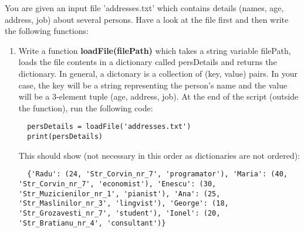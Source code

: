 \documentclass[11pt,a4paper]{report}
\begin{document}
You are given an input file 'addresses.txt' which contains details (names, age, address, job) about several persons. Have a look at the file first and then write the following functions:
\begin{enumerate}
 \item Write a function \textbf{loadFile(filePath)} which takes a string variable filePath, loads the file contents in a dictionary called persDetails and returns the dictionary. In general, a dictonary is a collection of (key, value) pairs. In your case, the key will be a string representing the person's name and the value will be a 3-element tuple (age, address, job). At the end of the script (outside the function), run the following code:
  \begin{lstlisting}
  persDetails = loadFile('addresses.txt')
  print(persDetails)
  \end{lstlisting}  
  This should show (not necessary in this order as dictionaries are not ordered):
  \begin{lstlisting}
  {'Radu': (24, 'Str_Corvin_nr_7', 'programator'), 'Maria': (40, 'Str_Corvin_nr_7', 'economist'), 'Enescu': (30, 'Str_Muzicienilor_nr_1', 'pianist'), 'Ana': (25, 'Str_Maslinilor_nr_3', 'lingvist'), 'George': (18, 'Str_Grozavesti_nr_7', 'student'), 'Ionel': (20, 'Str_Bratianu_nr_4', 'consultant')}
  \end{lstlisting}
    

\end{enumerate}
\end{document}
